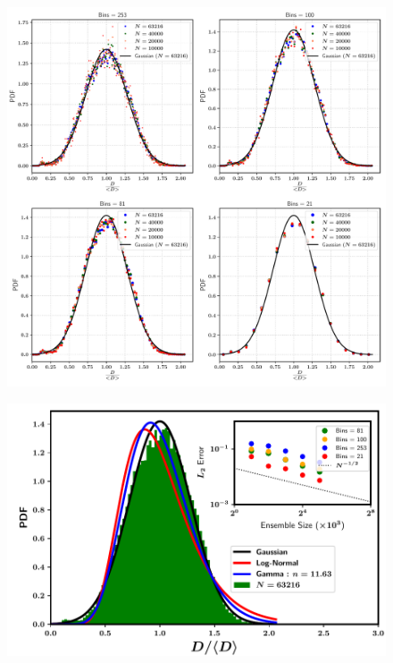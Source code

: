 

\begin{figure}
\centering
\includegraphics{plots/drop_stats/long_time_diameter_bins.pdf}
	\caption{\blindtext}
\label{t2_dia_bins}
\end{figure}



\begin{figure}
\centering
\includegraphics{plots/drop_stats/long_time_diameter_fits.pdf}
	\caption{\blindtext}
\label{t2_dia_fits}
\end{figure}


